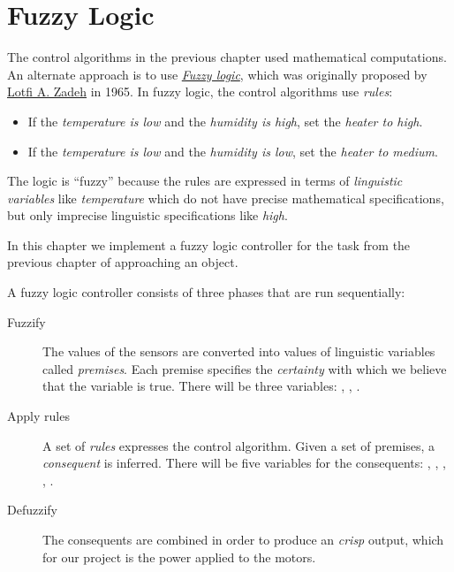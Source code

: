 \chapter{Fuzzy Logic}\label{ch.fuzzy}

The control algorithms in the previous chapter used mathematical
computations. An alternate approach is to use
\href{http://en.wikipedia.org/wiki/Fuzzy_logic}{\emph{Fuzzy logic}}, which was originally proposed by
\href{http://en.wikipedia.org/wiki/Lotfi_A._Zadeh}{Lotfi A. Zadeh} in
1965. In fuzzy logic, the control algorithms use \emph{rules}:

\begin{itemize}
\item If the \emph{temperature is low} and the \emph{humidity is high},
set the \emph{heater to high}.
\item If the \emph{temperature is low} and the \emph{humidity is low},
set the \emph{heater to medium}.
\end{itemize}

The logic is ``fuzzy'' because the rules are expressed in terms of
\emph{linguistic variables} like \emph{temperature} which do not have
precise mathematical specifications, but only imprecise linguistic
specifications like \emph{high}.

In this chapter we implement a fuzzy logic controller for
the task from the previous chapter of approaching an object.



A fuzzy logic controller consists of three phases that are run
 sequentially:

\begin{description}

\item[Fuzzify] The values of the sensors are converted into values of
linguistic variables called \emph{premises}. Each premise specifies the
\emph{certainty} with which we believe that the variable is true. There
will be three variables: , , .

\item[Apply rules] A set of \emph{rules} expresses the control
algorithm. Given a set of premises, a \emph{consequent} is inferred.
There will be five variables for the consequents: ,
, , , .

\item[Defuzzify] The consequents are combined in order to produce an
\emph{crisp} output, which for our project is the power applied to the
motors.

\end{description}

